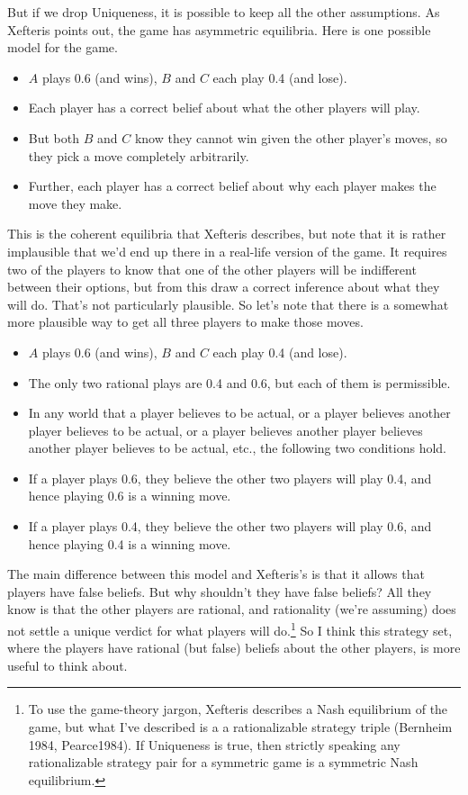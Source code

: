 \documentclass[
  11pt,
]{article}
\providecommand{\tightlist}{%
  \setlength{\itemsep}{0pt}\setlength{\parskip}{0pt}}
\begin{document}
But if we drop Uniqueness, it is possible to keep all the other assumptions. As Xefteris points out, the game has asymmetric equilibria. Here is one possible model for the game.

\begin{itemize}
\tightlist
\item
  \(A\) plays 0.6 (and wins), \(B\) and \(C\) each play 0.4 (and lose).
\item
  Each player has a correct belief about what the other players will play.
\item
  But both \(B\) and \(C\) know they cannot win given the other player's moves, so they pick a move completely arbitrarily.
\item
  Further, each player has a correct belief about why each player makes the move they make.
\end{itemize}

This is the coherent equilibria that Xefteris describes, but note that it is rather implausible that we'd end up there in a real-life version of the game. It requires two of the players to know that one of the other players will be indifferent between their options, but from this draw a correct inference about what they will do. That's not particularly plausible. So let's note that there is a somewhat more plausible way to get all three players to make those moves.

\begin{itemize}
\tightlist
\item
  \(A\) plays 0.6 (and wins), \(B\) and \(C\) each play 0.4 (and lose).
\item
  The only two rational plays are 0.4 and 0.6, but each of them is permissible.
\item
  In any world that a player believes to be actual, or a player believes another player believes to be actual, or a player believes another player believes another player believes to be actual, etc., the following two conditions hold.
\item
  If a player plays 0.6, they believe the other two players will play 0.4, and hence playing 0.6 is a winning move.
\item
  If a player plays 0.4, they believe the other two players will play 0.6, and hence playing 0.4 is a winning move.
\end{itemize}

The main difference between this model and Xefteris's is that it allows that players have false beliefs. But why shouldn't they have false beliefs? All they know is that the other players are rational, and rationality (we're assuming) does not settle a unique verdict for what players will do.\footnote{To use the game-theory jargon, Xefteris describes a Nash equilibrium of the game, but what I've described is a a rationalizable strategy triple (Bernheim 1984, Pearce1984). If Uniqueness is true, then strictly speaking any rationalizable strategy pair for a symmetric game is a symmetric Nash equilibrium.} So I think this strategy set, where the players have rational (but false) beliefs about the other players, is more useful to think about.
\end{document}
